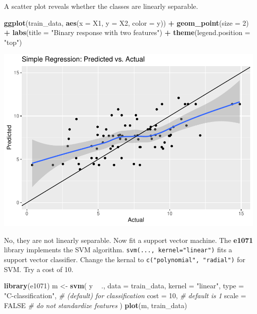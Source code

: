 \documentclass[
]{book}
\newenvironment{Shaded}{\begin{snugshade}}{\end{snugshade}}
\newcommand{\CommentTok}[1]{\textcolor[rgb]{0.56,0.35,0.01}{\textit{#1}}}
\newcommand{\DataTypeTok}[1]{\textcolor[rgb]{0.13,0.29,0.53}{#1}}
\newcommand{\DecValTok}[1]{\textcolor[rgb]{0.00,0.00,0.81}{#1}}
\newcommand{\KeywordTok}[1]{\textcolor[rgb]{0.13,0.29,0.53}{\textbf{#1}}}
\newcommand{\NormalTok}[1]{#1}
\newcommand{\OperatorTok}[1]{\textcolor[rgb]{0.81,0.36,0.00}{\textbf{#1}}}
\newcommand{\OtherTok}[1]{\textcolor[rgb]{0.56,0.35,0.01}{#1}}
\newcommand{\StringTok}[1]{\textcolor[rgb]{0.31,0.60,0.02}{#1}}
\begin{document}
A scatter plot reveals whether the classes are linearly separable.

\begin{Shaded}
\begin{Highlighting}[]
\KeywordTok{ggplot}\NormalTok{(train_data, }\KeywordTok{aes}\NormalTok{(}\DataTypeTok{x =}\NormalTok{ X1, }\DataTypeTok{y =}\NormalTok{ X2, }\DataTypeTok{color =}\NormalTok{ y)) }\OperatorTok{+}
\StringTok{  }\KeywordTok{geom_point}\NormalTok{(}\DataTypeTok{size =} \DecValTok{2}\NormalTok{) }\OperatorTok{+}
\StringTok{  }\KeywordTok{labs}\NormalTok{(}\DataTypeTok{title =} \StringTok{"Binary response with two features"}\NormalTok{) }\OperatorTok{+}
\StringTok{  }\KeywordTok{theme}\NormalTok{(}\DataTypeTok{legend.position =} \StringTok{"top"}\NormalTok{)}
\end{Highlighting}
\end{Shaded}

\includegraphics{data-sci_files/figure-latex/unnamed-chunk-97-1.pdf}

No, they are not linearly separable. Now fit a support vector machine. The \textbf{e1071} library implements the SVM algorithm. \texttt{svm(...,\ kernel="linear")} fits a support vector classifier. Change the kernal to \texttt{c("polynomial",\ "radial")} for SVM. Try a cost of 10.

\begin{Shaded}
\begin{Highlighting}[]
\KeywordTok{library}\NormalTok{(e1071)}
\NormalTok{m <-}\StringTok{ }\KeywordTok{svm}\NormalTok{(}
\NormalTok{  y }\OperatorTok{~}\StringTok{ }\NormalTok{., }
  \DataTypeTok{data =}\NormalTok{ train_data,}
  \DataTypeTok{kernel =} \StringTok{"linear"}\NormalTok{,}
  \DataTypeTok{type =} \StringTok{"C-classification"}\NormalTok{,  }\CommentTok{# (default) for classification}
  \DataTypeTok{cost =} \DecValTok{10}\NormalTok{,  }\CommentTok{# default is 1}
  \DataTypeTok{scale =} \OtherTok{FALSE}  \CommentTok{# do not standardize features}
\NormalTok{)}
\KeywordTok{plot}\NormalTok{(m, train_data)}
\end{Highlighting}
\end{Shaded}
\end{document}
